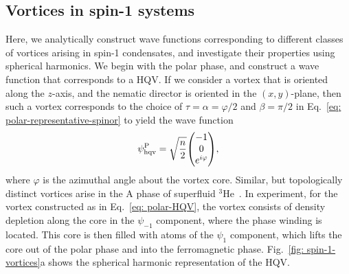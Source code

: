 \subsection{Vortices in spin-1 systems}\label{sec: vortices-spin-1}
Here, we analytically construct wave functions corresponding to different
classes of vortices arising in spin-1 condensates, and investigate their
properties using spherical harmonics.
We begin with the polar phase, and construct a wave function that corresponds
to a HQV\@.
If we consider a vortex that is oriented along the \(z\)-axis, and the nematic
director is oriented in the \((x, y)\)-plane, then such a vortex corresponds to
the choice of \(\tau=\alpha=\varphi/2 \) and \(\beta = \pi/2\) in
Eq.~\eqref{eq: polar-representative-spinor} to yield the wave function
\begin{align}
    \psi^\text{P}_\text{hqv} = \sqrt{\frac{n}{2}} \mqty(
    -1 \\
    0 \\
    e^{i\varphi}
    ),
    \label{eq: polar-HQV}
\end{align}
where \(\varphi \) is the azimuthal angle about the vortex core.
Similar, but topologically distinct vortices arise in the A phase of
superfluid \( ^3\)He~\cite{Salomaa1985, Salomaa1987}.
In experiment, for the vortex constructed as in Eq.~\eqref{eq: polar-HQV}, the
vortex consists of density depletion along the core in the \(\psi_{-1}\)
component, where the phase winding is located.
This core is then filled with atoms of the \(\psi_1 \) component, which lifts
the core out of the polar phase and into the ferromagnetic phase.
Fig.~\ref{fig: spin-1-vortices}a shows the spherical harmonic representation of
the HQV\@.
